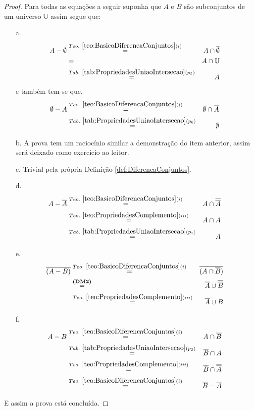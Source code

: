 \begin{proof}
	Para todas as equações a seguir suponha que $A$ e $B$ são subconjuntos de um universo $\mathbb{U}$ assim segue que:
	\begin{itemize}
		\item[a.] 
		\begin{eqnarray*}
			A - \emptyset & \stackrel{Teo. \  \ref{teo:BasicoDiferencaConjuntos}(i)}{=}& A \cap \overline{\emptyset} \\
			& = & A \cap \mathbb{U} \\
			& \stackrel{Tab. \ \ref{tab:PropriedadesUniaoIntersecao}(p_5)}{=} & A
		\end{eqnarray*}
		e também tem-se que, 
		\begin{eqnarray*}
			\emptyset - A &\stackrel{Teo. \  \ref{teo:BasicoDiferencaConjuntos}(i)}{=}& \emptyset \cap \overline{A}\\
			&\stackrel{Tab. \ \ref{tab:PropriedadesUniaoIntersecao}(p_6)}{=}& \emptyset
		\end{eqnarray*}
		
		\item[b.] A prova tem um raciocínio similar a demonstração do item anterior, assim será deixado como exercício ao leitor.
		\item[c.] Trivial pela própria Definição \ref{def:DiferencaConjuntos}.
		\item[d.] 
		\begin{eqnarray*}
			A - \overline{A} &\stackrel{Teo. \  \ref{teo:BasicoDiferencaConjuntos}(i)}{=}& A \cap \overline{\overline{A}}\\ 
			&\stackrel{Teo. \ \ref{teo:PropriedadesComplemento}(iii)}{=}& A \cap A\\
			&\stackrel{Tab. \ \ref{tab:PropriedadesUniaoIntersecao}(p_1)}{=}& A
		\end{eqnarray*} 
		\item[e.] 
		\begin{eqnarray*}
			\overline{(A - B)} &\stackrel{Teo. \  \ref{teo:BasicoDiferencaConjuntos}(i)}{=}& \overline{(A \cap \overline{B})}\\
			&\stackrel{\textbf{(DM2)}}{=}& \overline{A} \cup \overline{\overline{B}}\\
			&\stackrel{Teo. \ \ref{teo:PropriedadesComplemento}(iii)}{=}&  \overline{A} \cup  B
		\end{eqnarray*}
		\item[f.] 
		\begin{eqnarray*}
			A - B &\stackrel{Teo. \  \ref{teo:BasicoDiferencaConjuntos}(i)}{=}& A \cap \overline{B}\\
			&\stackrel{Tab. \ \ref{tab:PropriedadesUniaoIntersecao}(p_2)}{=}& \overline{B} \cap A\\
			&\stackrel{Teo. \ \ref{teo:PropriedadesComplemento}(iii)}{=}& \overline{B} \cap \overline{\overline{A}}\\
			&\stackrel{Teo. \  \ref{teo:BasicoDiferencaConjuntos}(i)}{=}&  \overline{B} - \overline{A}
		\end{eqnarray*}
	\end{itemize}
	E assim a prova está concluída.
\end{proof}

